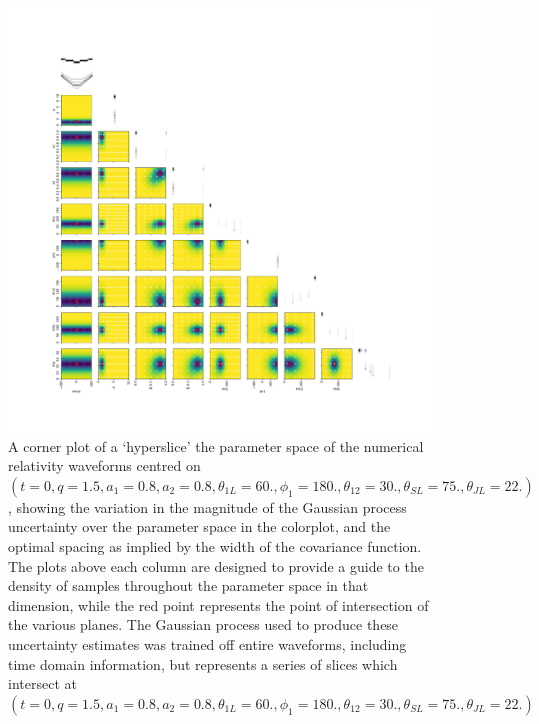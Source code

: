 \documentclass[openleft]{kentigern}
\theoremstyle{definition}
\begin{document}
\begin{figure}
  \centering
  \includegraphics[scale=0.35]{figures/spacings.pdf}
    \caption{A corner plot of a `hyperslice' the parameter space of the numerical relativity waveforms centred on $(t=0,  q=1.5,    a_1=0.8,    a_2=0.8,   \theta_{1L}=60. ,  \phi_1 = 180. ,   \theta_{12} = 30. ,   \theta_{SL} = 75. ,   \theta_{JL} = 22. )$, showing the variation in the magnitude of the Gaussian process uncertainty over the parameter space in the colorplot, and the optimal spacing as implied by the width of the covariance function. The plots above each column are designed to provide a guide to the density of samples throughout the parameter space in that dimension, while the red point represents the point of intersection of the various planes. The Gaussian process used to produce these uncertainty estimates was trained off entire waveforms, including time domain information, but represents a series of slices which intersect at $(t=0,  q=1.5,    a_1=0.8,    a_2=0.8,   \theta_{1L}=60. ,  \phi_1 = 180. ,   \theta_{12} = 30. ,   \theta_{SL} = 75. ,   \theta_{JL} = 22. )$}
  \label{fig:optimal-spacings}
\end{figure}
\end{document}
